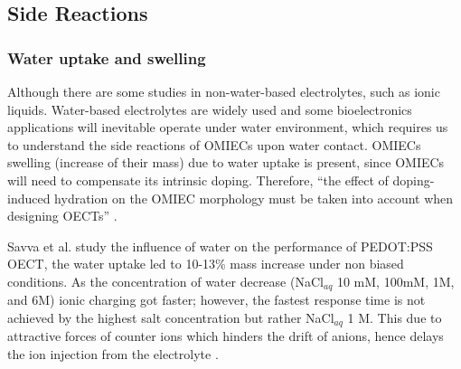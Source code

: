 \subsection{Side Reactions} \label{subsec:sidereac}



\subsubsection{Water uptake and swelling}

Although there are some studies in non-water-based electrolytes, such as ionic liquids. Water-based electrolytes are widely used and some bioelectronics applications will inevitable operate under water environment, which requires us to understand the side reactions of OMIECs upon water contact. OMIECs swelling (increase of their mass) due to water uptake is present, since OMIECs will need to compensate its intrinsic doping. Therefore, ``the effect of doping-induced hydration on the OMIEC morphology must be taken into account when designing OECTs'' \cite{savvaBalancingIonicElectronic2020}.

Savva et al. study the influence of water on the performance of PEDOT:PSS OECT, the water uptake %
led to 10-13\% mass increase under non biased conditions. As the concentration of water decrease (NaCl$_{aq}$ 10 mM, 100mM, 1M, and 6M) ionic charging got faster; %
however, the fastest %
response time is not achieved by the highest salt concentration but rather NaCl$_{aq}$ 1 M. This due to attractive forces of counter ions which %
hinders the drift of anions, hence delays the ion injection from the electrolyte %
\cite{savvaInfluenceWaterPerformance2019}.

